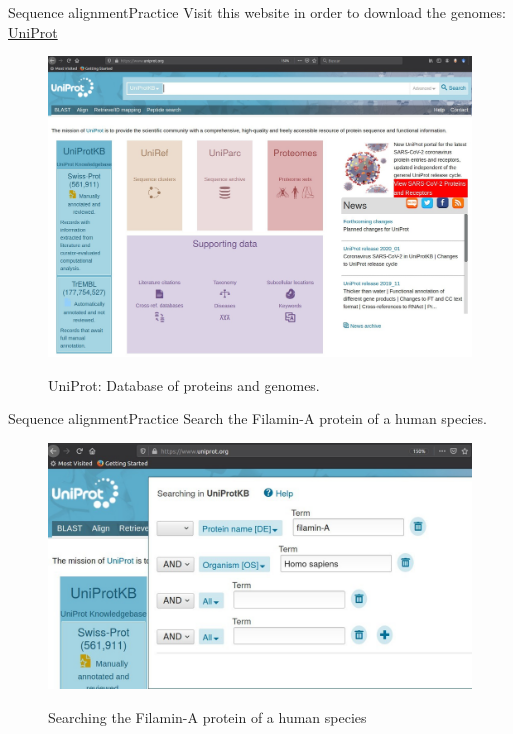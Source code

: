 \documentclass[10pt]{beamer}
\begin{document}
{%
\begin{frame}{Sequence alignment}{Practice}
Visit this website in order to download the genomes: \href{https://www.uniprot.org/}{UniProt} 
\begin{figure}[]
 \centering
    \includegraphics[width=\textwidth,height=0.7\textheight,keepaspectratio]{img/alignment/uniprot.jpg}
    \label{img:uniprot}
    \caption{UniProt: Database of proteins and genomes.}
\end{figure}
\end{frame}

\begin{frame}{Sequence alignment}{Practice}
Search the Filamin-A protein of a human species. 
\begin{figure}[]
 \centering
    \includegraphics[width=\textwidth,height=0.7\textheight,keepaspectratio]{img/alignment/uniprot2.jpg}
    \label{img:uniprot2}
    \caption{Searching the Filamin-A protein of a human  species}
\end{figure}
\end{frame}

}
\end{document}

